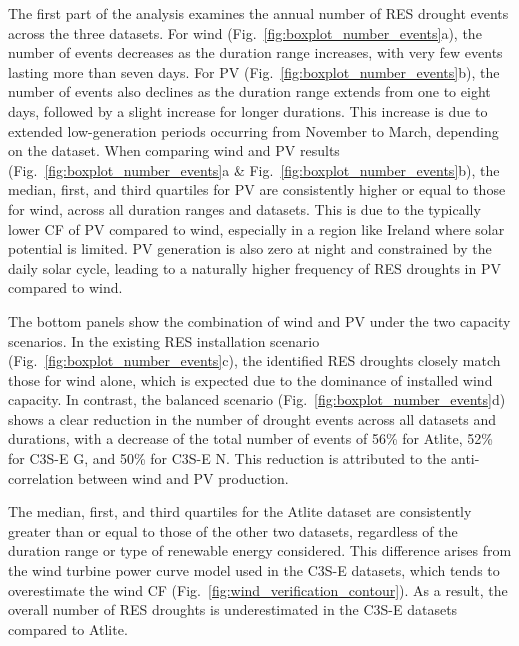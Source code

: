 \documentclass[a4paper, 11pt]{article}
\begin{document}
The first part of the analysis examines the annual number of RES drought events across the three datasets. For wind (Fig.~\ref{fig:boxplot_number_events}a), the number of events decreases as the duration range increases, with very few events lasting more than seven days. For PV (Fig.~\ref{fig:boxplot_number_events}b), the number of events also declines as the duration range extends from one to eight days, followed by a slight increase for longer durations. This increase is due to extended low-generation periods occurring from November to March, depending on the dataset. When comparing wind and PV results (Fig.~\ref{fig:boxplot_number_events}a \& Fig.~\ref{fig:boxplot_number_events}b), the median, first, and third quartiles for PV are consistently higher or equal to those for wind, across all duration ranges and datasets. This is due to the typically lower CF of PV compared to wind, especially in a region like Ireland where solar potential is limited. PV generation is also zero at night and constrained by the daily solar cycle, leading to a naturally higher frequency of RES droughts in PV compared to wind.

The bottom panels show the combination of wind and PV under the two capacity scenarios. In the existing RES installation scenario (Fig.~\ref{fig:boxplot_number_events}c), the identified RES droughts closely match those for wind alone, which is expected due to the dominance of installed wind capacity. In contrast, the balanced scenario (Fig.~\ref{fig:boxplot_number_events}d) shows a clear reduction in the number of drought events across all datasets and durations, with a decrease of the total number of events of 56\% for Atlite, 52\% for C3S-E G, and 50\% for C3S-E N. This reduction is attributed to the anti-correlation between wind and PV production.

The median, first, and third quartiles for the Atlite dataset are consistently greater than or equal to those of the other two datasets, regardless of the duration range or type of renewable energy considered. This difference arises from the wind turbine power curve model used in the C3S-E datasets, which tends to overestimate the wind CF (Fig.~\ref{fig:wind_verification_contour}). As a result, the overall number of RES droughts is underestimated in the C3S-E datasets compared to Atlite. 
\end{document}
